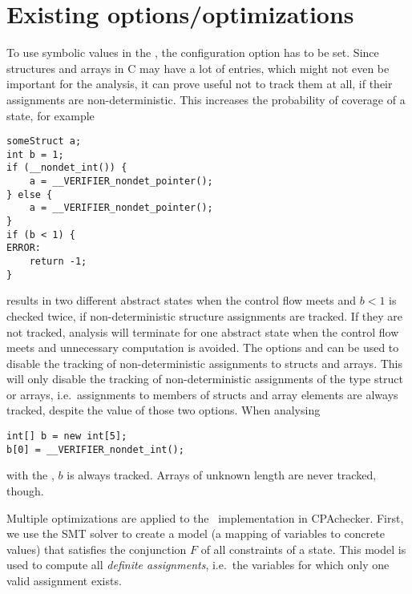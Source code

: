 \section{Existing options/optimizations}
To use symbolic values in the , the configuration option  has to be set.
Since structures and arrays in C may have a lot of entries, which might not even be important for the analysis,
it can prove useful not to track them at all, if their assignments are non-deterministic.
This increases the probability of coverage of a state, for example
\begin{lstlisting}
someStruct a;
int b = 1;
if (__nondet_int()) {
	a = __VERIFIER_nondet_pointer();
} else {
	a = __VERIFIER_nondet_pointer();
}
if (b < 1) {
ERROR:
	return -1;
}
\end{lstlisting}
results in two different abstract states when the control flow meets and $b < 1$ is checked twice, if non-deterministic structure assignments are tracked.
If they are not tracked, analysis will terminate for one abstract state when the control flow meets and unnecessary computation is avoided.
The options  and 
can be used to disable the tracking of non-deterministic assignments to structs and arrays.
This will only disable the tracking of non-deterministic assignments of the type struct or arrays, i.e.\ assignments to members of structs and array elements
are always tracked, despite the value of those two options.
When analysing
\begin{lstlisting}
int[] b = new int[5];
b[0] = __VERIFIER_nondet_int();
\end{lstlisting}
with the \symbolicExecutionCPA, $b$ is always tracked.
Arrays of unknown length are never tracked, though.

Multiple optimizations are applied to the \constraintsCPA\ implementation in CPAchecker.
First, we use the SMT solver to create a model (a mapping of variables to concrete values) that satisfies the conjunction $F$ of all constraints of a state.
This model is used to compute all \emph{definite assignments}, i.e.\ the variables for which only one valid assignment exists.

